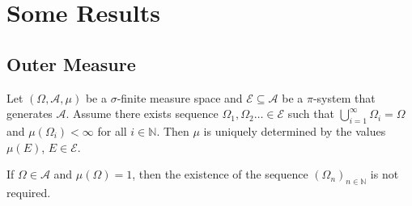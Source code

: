 \section{Some Results}

\subsection{Outer Measure}

\begin{lemma}
\label{uniquely defined by base pi sys}
    Let $(\Omega,\mathcal{A},\mu)$ be a $\sigma$-finite measure space and $\mathcal{E}\subseteq\mathcal{A}$ be a $\pi$-system that generates $\mathcal{A}$. Assume there exists sequence $\Omega_1,\Omega_2\ldots\in\mathcal{E}$ such that $\bigcup_{i=1}^\infty\Omega_i=\Omega$ and $\mu(\Omega_i)<\infty$ for all $i\in\mathbb{N}$. Then $\mu$ is uniquely determined by the values $\mu(E)$, $E\in\mathcal{E}$.
    
    If $\Omega\in\mathcal{A}$ and $\mu(\Omega)=1$, then the existence of the sequence $(\Omega_n)_{n\in\mathbb{N}}$ is not required.
\end{lemma}
